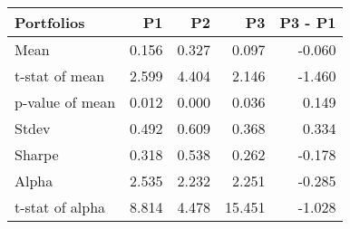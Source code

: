 \begin{tabular}{lrrrr}
\toprule
Portfolios & P1 & P2 & P3 & P3 - P1 \\
\midrule
Mean & 0.156 & 0.327 & 0.097 & -0.060 \\
t-stat of mean & 2.599 & 4.404 & 2.146 & -1.460 \\
p-value of mean & 0.012 & 0.000 & 0.036 & 0.149 \\
Stdev & 0.492 & 0.609 & 0.368 & 0.334 \\
Sharpe & 0.318 & 0.538 & 0.262 & -0.178 \\
Alpha & 2.535 & 2.232 & 2.251 & -0.285 \\
t-stat of alpha & 8.814 & 4.478 & 15.451 & -1.028 \\
\bottomrule
\end{tabular}
